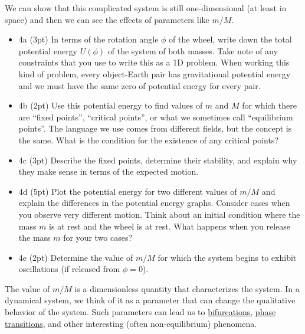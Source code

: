 \documentclass[11pt]{article}
\providecommand{\tightlist}{%
      \setlength{\itemsep}{0pt}\setlength{\parskip}{0pt}}
\begin{document}
We can show that this complicated system is still one-dimensional (at
least in space) and then we can see the effects of parameters like
\(m/M\).

\begin{itemize}
\tightlist
\item
  4a (3pt) In terms of the rotation angle \(\phi\) of the wheel, write
  down the total potential energy \(U(\phi)\) of the system of both
  masses. Take note of any constraints that you use to write this as a
  1D problem. When working this kind of problem, every object-Earth pair
  has gravitational potential energy and we must have the same zero of
  potential energy for every pair.
\end{itemize}

    \begin{itemize}
\tightlist
\item
  4b (2pt) Use this potential energy to find values of \(m\) and \(M\)
  for which there are ``fixed points'', ``critical points'', or what we
  sometimes call ``equilibrium points''. The language we use comes from
  different fields, but the concept is the same. What is the condition
  for the existence of any critical points?
\end{itemize}

    \begin{itemize}
\tightlist
\item
  4c (3pt) Describe the fixed points, determine their stability, and
  explain why they make sense in terms of the expected motion.
\end{itemize}

    \begin{itemize}
\tightlist
\item
  4d (5pt) Plot the potential energy for two different values of \(m/M\)
  and explain the differences in the potential energy graphs. Consider
  cases when you observe very different motion. Think about an initial
  condition where the mass \(m\) is at rest and the wheel is at rest.
  What happens when you release the mass \(m\) for your two cases?
\end{itemize}

    \begin{itemize}
\tightlist
\item
  4e (2pt) Determine the value of \(m/M\) for which the system begins to
  exhibit oscillations (if released from \(\phi=0\)).
\end{itemize}

The value of \(m/M\) is a dimensionless quantity that characterizes the
system. In a dynamical system, we think of it as a parameter that can
change the qualitative behavior of the system. Such parameters can lead
us to
\href{https://en.wikipedia.org/wiki/Bifurcation_theory}{bifurcations},
\href{https://en.wikipedia.org/wiki/Phase_transition}{phase
transitions}, and other interesting (often non-equilibrium) phenomena.
\end{document}
